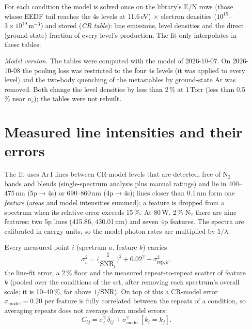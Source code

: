 \documentclass[11pt]{article}
\newcommand{\EN}{E/N}
\newcommand{\nc}{n_c}
\begin{document}
For each condition the model is solved once on the library's \EN{} rows (those whose EEDF tail reaches the 4s levels at 11.6\,eV) $\times$ \NNe{} electron densities
($10^{15}$--$3\times10^{19}$\,m$^{-3}$) and stored (\emph{CR table}): line emissions, level densities and the
direct (ground-state) fraction of every level's production. The fit only interpolates in these tables.

\textit{Model version.} The tables were computed with the model of 2026-10-07. On 2026-10-08 the pooling loss was
restricted to the four 4s levels (it was applied to every level) and the two-body quenching of the metastables by
ground-state Ar was removed. Both change the level densities by less than 2\,\% at 1\,Torr (less than 0.5\,\% near
$\nc$); the tables were not rebuilt.

\section{Measured line intensities and their errors}
The fit uses Ar\,I lines between CR-model levels that are detected, free of N$_2$ bands and blends (single-spectrum
analysis plus manual ratings) and lie in 400--475\,nm (5p$\to$4s) or 690--860\,nm (4p$\to$4s); lines closer than
0.1\,nm form one \emph{feature} (areas and model intensities summed); a feature is dropped from a spectrum when its
relative error exceeds 15\,\%. At 80\,W, 2\,\% N$_2$ there are nine features: two 5p lines (415.86, 430.01\,nm) and
seven 4p features. The spectra are calibrated in energy units, so the model photon rates are multiplied by
$1/\lambda$.

Every measured point $i$ (spectrum $a$, feature $k$) carries
\begin{equation}
\sigma_i^2 = \Big(\frac{1}{\mathrm{SNR}_i}\Big)^2 + 0.02^2 + \sigma_{\mathrm{rep},k}^2 ,
\end{equation}
the line-fit error, a 2\,\% floor and the measured repeat-to-repeat scatter of feature $k$ (pooled over the
conditions of the set, after removing each spectrum's overall scale; it is 10--40\,\%, far above $1/\mathrm{SNR}$).
On top of this a CR-model error $\sigma_{\mathrm{model}}=0.20$ per feature is fully correlated between the repeats
of a condition, so averaging repeats does not average down model errors:
\begin{equation}
C_{ij} = \sigma_i^2\,\delta_{ij} + \sigma_{\mathrm{model}}^2\,[k_i = k_j] .
\label{eq:cov}
\end{equation}
\end{document}
